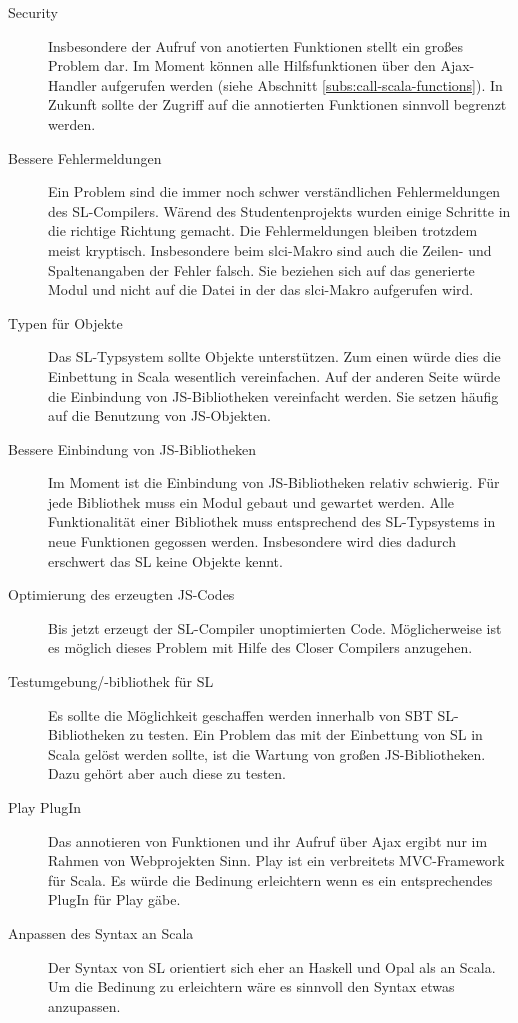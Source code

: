 \documentclass[12pt,bibtotoc]{scrreprt}
\begin{document}
\begin{description}
 \item[Security] Insbesondere der Aufruf von anotierten Funktionen stellt ein großes Problem dar. Im Moment können alle Hilfsfunktionen über den Ajax-Handler aufgerufen werden (siehe Abschnitt \ref{subs:call-scala-functions}). In Zukunft sollte der Zugriff auf die annotierten Funktionen sinnvoll begrenzt werden.
 \item[Bessere Fehlermeldungen] Ein Problem sind die immer noch schwer verständlichen Fehlermeldungen des SL-Compilers. Wärend des Studentenprojekts wurden einige Schritte in die richtige Richtung gemacht. Die Fehlermeldungen bleiben trotzdem meist kryptisch. Insbesondere beim slci-Makro sind auch die Zeilen- und Spaltenangaben der Fehler falsch. Sie beziehen sich auf das generierte Modul und nicht auf die Datei in der das slci-Makro aufgerufen wird. 
 \item[Typen für Objekte] Das SL-Typsystem sollte Objekte unterstützen. Zum einen würde dies die Einbettung in Scala wesentlich vereinfachen. Auf der anderen Seite würde die Einbindung von JS-Bibliotheken vereinfacht werden. Sie setzen häufig auf die Benutzung von JS-Objekten. 
 \item[Bessere Einbindung von JS-Bibliotheken] Im Moment ist die Einbindung von JS-Bibliotheken relativ schwierig. Für jede Bibliothek muss ein Modul gebaut und gewartet werden. Alle Funktionalität einer Bibliothek muss entsprechend des SL-Typsystems in neue Funktionen gegossen werden. Insbesondere wird dies dadurch erschwert das SL keine Objekte kennt.
 \item[Optimierung des erzeugten JS-Codes] Bis jetzt erzeugt der SL-Compiler unoptimierten Code. Möglicherweise ist es möglich dieses Problem mit Hilfe des Closer Compilers\cite{} anzugehen.
 \item[Testumgebung/-bibliothek für SL] Es sollte die Möglichkeit geschaffen werden innerhalb von SBT SL-Bibliotheken zu testen. Ein Problem das mit der Einbettung von SL in Scala gelöst werden sollte, ist die Wartung von großen JS-Bibliotheken. Dazu gehört aber auch diese zu testen.
 \item[Play PlugIn] Das annotieren von Funktionen und ihr Aufruf über Ajax ergibt nur im Rahmen von Webprojekten Sinn. Play ist ein verbreitets MVC-Framework für Scala. Es würde die Bedinung erleichtern wenn es ein entsprechendes PlugIn für Play gäbe. 
 \item[Anpassen des Syntax an Scala] Der Syntax von SL orientiert sich eher an Haskell und Opal als an Scala. Um die Bedinung zu erleichtern wäre es sinnvoll den Syntax etwas anzupassen.
\end{description}
\end{document}
